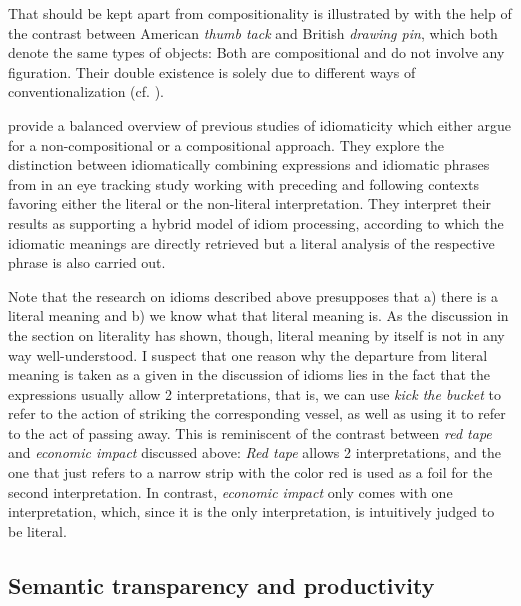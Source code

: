 That  should be kept apart from compositionality is illustrated
by \citet{Nunbergetal:1994} with the help of the contrast between American \emph{thumb tack} and
British \emph{drawing pin}, which both denote the same types of objects: Both
are compositional and do not involve any figuration. Their double
existence is solely due to different ways
of conventionalization (cf. \citealt[495]{Nunbergetal:1994}).  


\citet{TitoneandConnine:1999} provide a balanced overview of previous studies of
idiomaticity which either argue for a non-compositional or a compositional
approach. They explore the distinction between idiomatically combining expressions
and idiomatic phrases from \citet{Nunbergetal:1994} in an eye tracking study
working with preceding and following contexts favoring either the literal or
the non-literal interpretation. 
They interpret their results as supporting a
hybrid model of idiom processing, according to which the idiomatic meanings
are directly retrieved but a literal analysis of the respective phrase is also
carried out. 

Note that the research on idioms described above presupposes that a)
there is a literal meaning and b) we 
know what that literal meaning is. 
As the discussion in the section on
literality has shown, though, literal meaning by itself is not in any
way well-understood. I suspect that one reason why the departure from
literal meaning is taken as a given in the discussion of idioms lies
in the fact that the expressions usually allow 2 interpretations,
that is, we can use \emph{kick the bucket} to refer to the action of
striking the corresponding vessel, as well as using it to refer to the act of
passing away. This is reminiscent of the contrast between \emph{red
  tape} and \emph{economic impact} discussed above: \emph{Red tape}
allows 2 interpretations, and the one that just refers to a narrow
strip with the color red is used as a foil for the second
interpretation. In contrast, \emph{economic impact} only comes with
one interpretation, which, since it is the only interpretation, is
intuitively judged to be literal.


\subsection{Semantic transparency and productivity}
\label{sec:st-productivity}

